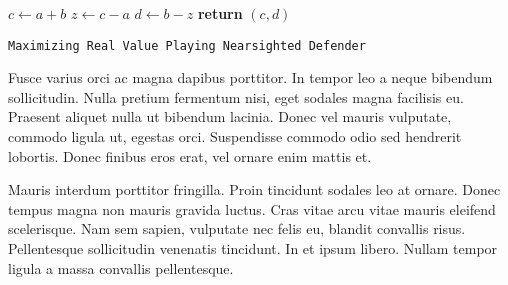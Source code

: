 \documentclass{article}
\theoremstyle{plain}
\theoremstyle{definition}
\theoremstyle{remark}
\begin{document}
\begin{center}
	\begin{minipage}{1\linewidth} %
		\begin{algorithm}[H]
			\medskip
			$c \leftarrow a + b$ \;
			$z \leftarrow c - a$ \;
			$d \leftarrow b - z$ \;
			{\bf return} $(c,d)$ \;
			\caption{\texttt{Maximizing Real Value Playing Nearsighted Defender}} %
			\label{alg:nearsighted}   %
		\end{algorithm}
	\end{minipage}
\end{center}

Fusce varius orci ac magna dapibus porttitor. In tempor leo a neque bibendum sollicitudin. Nulla pretium fermentum nisi, eget sodales magna facilisis eu. Praesent aliquet nulla ut bibendum lacinia. Donec vel mauris vulputate, commodo ligula ut, egestas orci. Suspendisse commodo odio sed hendrerit lobortis. Donec finibus eros erat, vel ornare enim mattis et.

Mauris interdum porttitor fringilla. Proin tincidunt sodales leo at ornare. Donec tempus magna non mauris gravida luctus. Cras vitae arcu vitae mauris eleifend scelerisque. Nam sem sapien, vulputate nec felis eu, blandit convallis risus. Pellentesque sollicitudin venenatis tincidunt. In et ipsum libero. Nullam tempor ligula a massa convallis pellentesque.

\end{document}
